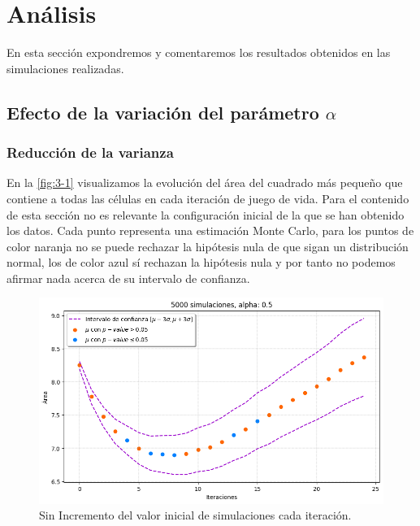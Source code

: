 \documentclass[../proyecto.tex]{memoir}
\begin{document}
\chapter{Análisis}

En esta sección expondremos y comentaremos los resultados obtenidos en las simulaciones realizadas.

\section{Efecto de la variación del parámetro $\alpha$}

\subsection{Reducción de la varianza}

En la \autoref{fig:3-1} visualizamos la evolución del área del cuadrado más pequeño que contiene a todas las células en cada iteración de juego de vida. Para el contenido de esta sección no es relevante la configuración inicial de la que se han obtenido los datos. Cada punto representa una estimación Monte Carlo, para los puntos de color naranja no se puede rechazar la hipótesis nula de que sigan un distribución normal, los de color azul sí rechazan la hipótesis nula y por tanto no podemos afirmar nada acerca de su intervalo de confianza.

\begin{figure}[H]
	\centering
    \includegraphics[width=\textwidth]{./images/iteracion_without_inc.png}
    \caption{Sin Incremento del valor inicial de simulaciones cada iteración.}
    \label{fig:3-1}
\end{figure}
\end{document}
